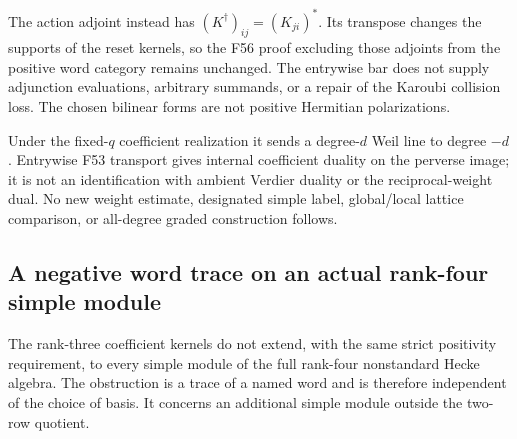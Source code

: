 \documentclass[11pt,a4paper]{article}
\newcommand{\fid}[1]{\textsf{#1}}\newcommand{\gate}[1]{\textsf{#1}}
\theoremstyle{named}\newtheorem{finding}{Finding}[section]
\theoremstyle{definition}\newtheorem{definition}[finding]{Definition}
\theoremstyle{remark}\newtheorem{remark}[finding]{Remark}
\begin{document}
The action adjoint instead has
$(K^\dagger)_{ij}=(K_{ji})^*$.
Its transpose changes the supports of the reset kernels,
so the \fid{F56} proof excluding those adjoints from
the positive word category remains unchanged.
The entrywise bar does not supply adjunction evaluations,
arbitrary summands, or a repair of the Karoubi collision loss.
The chosen bilinear forms are not positive Hermitian
polarizations.

Under the fixed-$q$ coefficient realization it sends a
degree-$d$ Weil line to degree $-d$.
Entrywise \fid{F53} transport gives internal coefficient
duality on the perverse image; it is not an identification
with ambient Verdier duality or the reciprocal-weight dual.
No new weight estimate, designated simple label, global/local
lattice comparison, or all-degree graded construction follows.

\subsection{A negative word trace on an actual rank-four simple module}
The rank-three coefficient kernels do not extend, with the same
strict positivity requirement, to every simple module of the full
rank-four nonstandard Hecke algebra. The obstruction is a trace of
a named word and is therefore independent of the choice of basis.
It concerns an additional simple module outside the two-row quotient.
\end{document}
